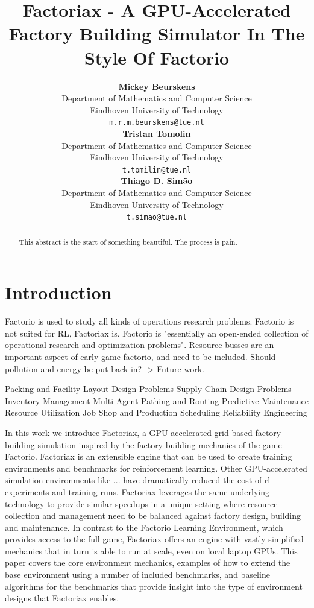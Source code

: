 \documentclass{article}
\title{Factoriax - A GPU-Accelerated Factory Building Simulator In The Style Of Factorio}
\author{%
  \textbf{Mickey Beurskens} \\
  Department of Mathematics and Computer Science \\
  Eindhoven University of Technology \\
  \texttt{m.r.m.beurskens@tue.nl} \\
  \And 
  \textbf{Tristan Tomolin} \\
  Department of Mathematics and Computer Science \\
  Eindhoven University of Technology \\
  \texttt{t.tomilin@tue.nl} \\
  \And
  \textbf{Thiago D. Simão} \\
  Department of Mathematics and Computer Science \\
  Eindhoven University of Technology \\
  \texttt{t.simao@tue.nl} \\
}
\begin{document}
\maketitle

\begin{abstract}
  This abstract is the start of something beautiful. The process is pain. 
\end{abstract}


\section{Introduction}

Factorio is used to study all kinds of operations research problems. 
Factorio is not suited for RL, Factoriax is.
Factorio is "essentially an open-ended collection of operational research and optimization problems".
Resource busses are an important aspect of early game factorio, and need to be included.
Should pollution and energy be put back in? -> Future work.

Packing and Facility Layout Design Problems
Supply Chain Design Problems
Inventory Management
Multi Agent Pathing and Routing
Predictive Maintenance
Resource Utilization
Job Shop and Production Scheduling
Reliability Engineering

In this work we introduce Factoriax, a GPU-accelerated grid-based factory building simulation inspired by the factory building mechanics of the game Factorio.
Factoriax is an extensible engine that can be used to create training environments and benchmarks for reinforcement learning. 
Other GPU-accelerated simulation environments like ... have dramatically reduced the cost of \gls{rl} experiments and training runs.
Factoriax leverages the same underlying technology to provide similar speedups in a unique setting where resource collection and management need to be balanced against factory design, building and maintenance. 
In contrast to the Factorio Learning Environment, which provides access to the full game, Factoriax offers an engine with vastly simplified mechanics that in turn is able to run at scale, even on local laptop GPUs.  
This paper covers the core environment mechanics, examples of how to extend the base environment using a number of included benchmarks, and baseline algorithms for the benchmarks that provide insight into the type of environment designs that Factoriax enables. 
\end{document}
